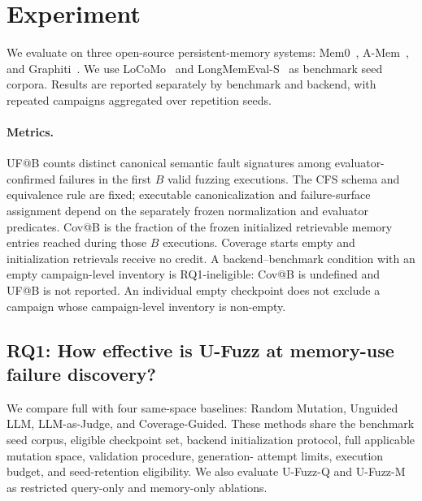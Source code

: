 \section{Experiment}
\label{sec:experiments}

We evaluate \system on three open-source persistent-memory systems:
Mem0~\citep{chhikara2025mem0}, A-Mem~\citep{xu2025amem}, and
Graphiti~\citep{rasmussen2025zep}. We use
LoCoMo~\citep{maharana2024evaluating} and
LongMemEval-S~\citep{wu2024longmemeval} as benchmark seed corpora. Results are
reported separately by benchmark and backend, with repeated campaigns
aggregated over repetition seeds.

\paragraph{Metrics.}
UF@B counts distinct canonical semantic fault signatures among evaluator-
confirmed failures in the first \(B\) valid fuzzing executions. The CFS schema
and equivalence rule are fixed; executable canonicalization and failure-surface
assignment depend on the separately frozen normalization and evaluator
predicates. Cov@B is the fraction of the frozen initialized retrievable memory
entries reached during those \(B\) executions. Coverage starts empty and
initialization retrievals receive no credit. A backend--benchmark condition
with an empty campaign-level inventory is RQ1-ineligible: Cov@B is undefined
and UF@B is not reported. An individual empty checkpoint does not exclude a
campaign whose campaign-level inventory is non-empty.

\subsection{RQ1: How effective is U-Fuzz at memory-use failure discovery?}
\label{subsec:rq1}

We compare full \system with four same-space baselines: Random Mutation,
Unguided LLM, LLM-as-Judge, and Coverage-Guided. These methods share the
benchmark seed corpus, eligible checkpoint set, backend initialization
protocol, full applicable mutation space, validation procedure, generation-
attempt limits, execution budget, and seed-retention eligibility. We also
evaluate U-Fuzz-Q and U-Fuzz-M as restricted query-only and memory-only
ablations.

